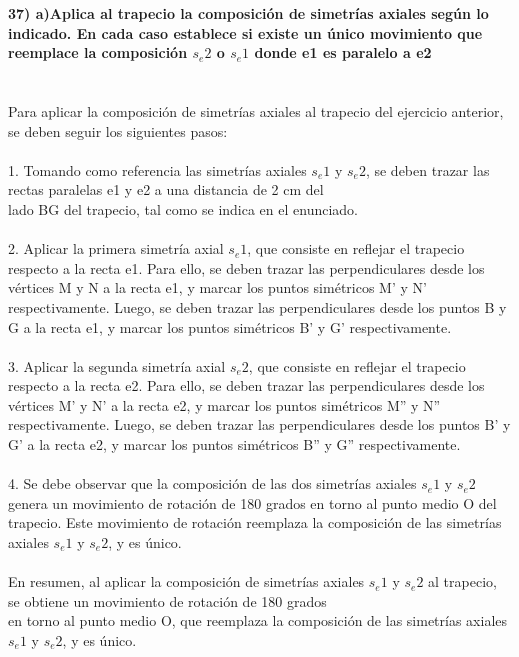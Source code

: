 \documentclass{article}
\begin{document}
{\bf 37) a)Aplica al trapecio la composición de simetrías axiales según lo indicado. En cada caso establece si existe un único movimiento que reemplace la composición $s_e2$ o $s_e1$ donde e1 es paralelo a e2 }\\
\\ \\
Para aplicar la composición de simetrías axiales al trapecio del ejercicio anterior, se deben seguir los siguientes pasos:\\
\\
1. Tomando como referencia las simetrías axiales $s_e1$ y $s_e2$, se deben trazar las rectas paralelas e1 y e2 a una distancia de 2 cm del\\
lado BG del trapecio, tal como se indica en el enunciado.\\
\\
2. Aplicar la primera simetría axial $s_e1$, que consiste en reflejar el trapecio respecto a la recta e1. Para ello, se deben trazar las perpendiculares desde los vértices M y N a la recta e1, y marcar los puntos simétricos M' y N' respectivamente. Luego, se deben trazar las perpendiculares desde los puntos B y G a la recta e1, y marcar los puntos simétricos B' y G' respectivamente.\\
\\
3. Aplicar la segunda simetría axial $s_e2$, que consiste en reflejar el trapecio respecto a la recta e2. Para ello, se deben trazar las perpendiculares desde los vértices M' y N' a la recta e2, y marcar los puntos simétricos M'' y N'' respectivamente. Luego, se deben trazar las perpendiculares desde los puntos B' y G' a la recta e2, y marcar los puntos simétricos B'' y G'' respectivamente.\\
\\
4. Se debe observar que la composición de las dos simetrías axiales $s_e1$ y $s_e2$ genera un movimiento de rotación de 180 grados en torno al punto medio O del trapecio. Este movimiento de rotación reemplaza la composición de las simetrías axiales $s_e1$ y $s_e2$, y es único.\\
\\
En resumen, al aplicar la composición de simetrías axiales $s_e1$ y $s_e2$ al trapecio, se obtiene un movimiento de rotación de 180 grados\\
en torno al punto medio O, que reemplaza la composición de las simetrías axiales $s_e1$ y $s_e2$, y es único.\\
\\
\\
\end{document}
